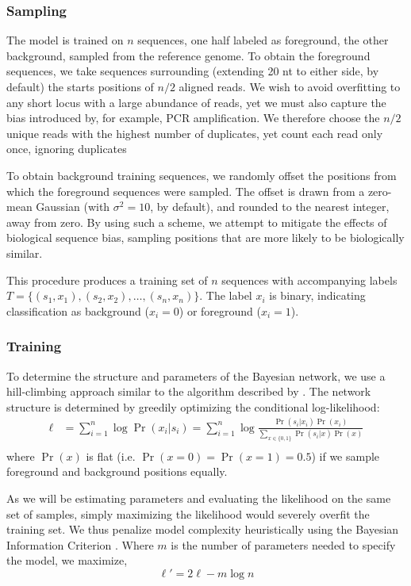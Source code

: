 \documentclass{bioinfo}
\begin{document}
\subsubsection{Sampling}

The model is trained on $n$ sequences, one half labeled as foreground, the other
background, sampled from the reference genome. To obtain the foreground
sequences, we take sequences surrounding (extending 20 nt to either side, by
default) the starts positions of $n/2$ aligned reads. We wish to avoid
overfitting to any short locus with a large abundance of reads, yet we must also
capture the bias introduced by, for example, PCR amplification. We therefore
choose the $n/2$ unique reads with the highest number of duplicates, yet count
each read only once, ignoring duplicates

To obtain background training sequences, we randomly offset the positions from
which the foreground sequences were sampled.  The offset is drawn from a
zero-mean Gaussian (with $\sigma^2 = 10$, by default), and rounded to the
nearest integer, away from zero.  By using such a scheme, we attempt to mitigate
the effects of biological sequence bias, sampling positions that are more likely
to be biologically similar.

This procedure produces a training set of $n$ sequences with accompanying labels
$T = \{ (s_1, x_1), (s_2, x_2), \dots, (s_n, x_n) \}$. The label $x_i$ is
binary, indicating classification as background ($x_i = 0$) or foreground ($x_i
= 1$).

\subsubsection{Training}


To determine the structure and parameters of the Bayesian network, we use a
hill-climbing approach similar to the algorithm described by \citet{Grossman2004}.
The network structure is determined by greedily optimizing the conditional
log-likelihood:
\begin{align*}
\ell &= \sum_{i=1}^{n} \log \Pr( x_i | s_i ) 
=
\sum_{i=1}^{n} \log \frac{ \Pr(s_i | x_i) \Pr( x_i ) }{
\sum_{x \in \{0,1\}} \Pr( s_i | x ) \Pr(x) } \\
\end{align*}
where $\Pr(x)$ is flat (i.e.  $\Pr( x = 0 ) = \Pr( x = 1 ) =
0.5$) if we sample foreground and background positions equally.

As we will be estimating parameters and evaluating the likelihood on the same
set of samples, simply maximizing the likelihood would severely overfit the
training set. We thus penalize model complexity heuristically using the Bayesian
Information Criterion \citep{Schwarz1978a}. Where $m$ is the number of
parameters needed to specify the model, we maximize, 
$$ \ell' = 2 \ell - m \log n $$
\end{document}
